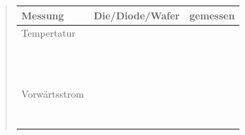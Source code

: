 \begin{quote}
      \begin{table}[h]
                 \begin{addmargin}[-1cm]{3cm}
    	         \centering
                     \begin{tabular}{|p{3cm}|p{3cm}|p{10.2cm}|}
         \hline
         Messung                 & Die/Diode/Wafer & gemessen\\ 
         \hline
         Tempertatur  &    & \\
                                 &           &                  \\ 
                                 &           &                  \\
                                 &           &                  \\ 
                                 &           &                  \\
                                 &           &                  \\ 
                                 &           &                  \\
                                 &           &                  \\ 
                                 &           &                  \\
                                 &           &                  \\ 
                                 &           &                  \\
                                 &           &                  \\ 
                                 &           &                  \\
         \hline
         Vorwärtsstrom  &    & \\ 
                                 &           &                  \\ 
                                 &           &                  \\
                                 &           &                  \\ 
                                 &           &                  \\
                                 &           &                  \\ 
                                 &           &                  \\
                                 &           &                  \\ 

\end{tabular}
\end{addmargin}
\end{table}
\end{quote}
